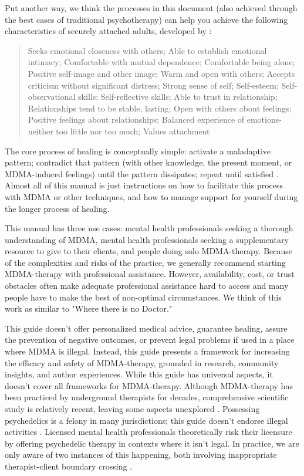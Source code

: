 \documentclass[12pt,letterpaper]{book}
\begin{document}
Put another way, we think the processes in this document (also achieved through the best cases of traditional psychotherapy) can help you achieve the following characteristics of securely attached adults, developed by \textcite{brownAttachmentDisturbances}:
\begin{quotation}
Seeks emotional closeness with others; Able to establish emotional intimacy; Comfortable with mutual dependence; Comfortable being alone; Positive self-image and other image; Warm and open with others; Accepts criticism without significant distress; Strong sense of self; Self-esteem; Self-observational skills; Self-reflective skills; Able to trust in relationship; Relationships tend to be stable, lasting; Open with others about feelings; Positive feelings about relationships; Balanced experience of emotions-neither too little nor too much; Values attachment
\end{quotation}

The core process of healing is conceptually simple: activate a maladaptive pattern; contradict that pattern (with other knowledge, the present moment, or MDMA-induced feelings) until the pattern dissipates; repeat until satisfied \cite{eckerUnlocking}. Almost all of this manual is just instructions on how to facilitate this process with MDMA or other techniques, and how to manage support for yourself during the longer process of healing.

This manual has three use cases: mental health professionals seeking a thorough understanding of MDMA, mental health professionals seeking a supplementary resource to give to their clients, and people doing solo MDMA-therapy. Because of the complexities and risks of the practice, we generally recommend starting MDMA-therapy with professional assistance. However, availability, cost, or trust obstacles often make adequate professional assistance hard to access and many people have to make the best of non-optimal circumstances. We think of this work as similar to "Where there is no Doctor."

This guide doesn't offer personalized medical advice, guarantee healing, assure the prevention of negative outcomes, or prevent legal problems if used in a place where MDMA is illegal. Instead, this guide presents a framework for increasing the efficacy and safety of MDMA-therapy, grounded in research, community insights, and author experiences. While this guide has universal aspects, it doesn't cover all frameworks for MDMA-therapy. Although MDMA-therapy has been practiced by underground therapists for decades, comprehensive scientific study is relatively recent, leaving some aspects unexplored \cite{passieHistory}. Possessing psychedelics is a felony in many jurisdictions; this guide doesn't endorse illegal activities \cite{alphaLegalization}. Licensed mental health professionals theoretically risk their licensure by offering psychedelic therapy in contexts where it isn't legal. In practice, we are only aware of two instances of this happening, both involving inappropriate therapist-client boundary crossing \cite{sessa2015underground,lindsayLicense}.
\end{document}
